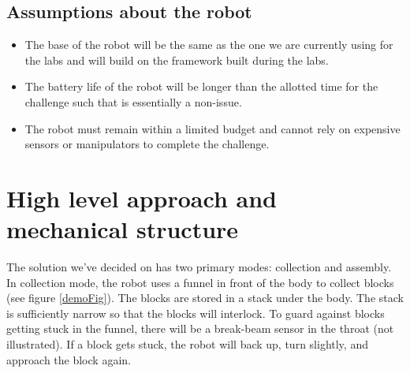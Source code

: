 \documentclass[letterpaper,11pt]{article}
\begin{document}
\subsection{Assumptions about the robot}
\begin{itemize}
 \item The base of the robot will be the same as the one we are currently using for the labs and will build on the framework built during the labs.  
 \item The battery life of the robot will be longer than the allotted time for the challenge such that is essentially a non-issue.
 \item The robot must remain within a limited budget and cannot rely on expensive sensors or manipulators to complete the challenge.
\end{itemize}

\section{High level approach and mechanical structure}
The solution we've decided on has two primary modes: collection and assembly.
In collection mode, the robot uses a funnel in front of the body to collect blocks (see figure \ref{demoFig}).
The blocks are stored in a stack under the body.
The stack is sufficiently narrow so that the blocks will interlock.
To guard against blocks getting stuck in the funnel,
there will be a break-beam sensor in the throat (not illustrated).
If a block gets stuck, the robot will back up, turn slightly, and approach the block again.
\end{document}
